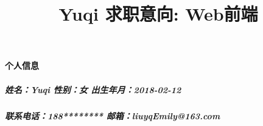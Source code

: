 \documentclass[UTF8]{ctexart}
\title{\textbf{\Large Yuqi \small 求职意向: Web前端}}
\date{} %
\begin{document}
\maketitle
\thispagestyle{fancy} %
\paragraph{个人信息}
\subparagraph{\textmd{姓名：Yuqi \hfill 性别：女 \hfill 出生年月：2018-02-12}} %
\subparagraph{\textmd{联系电话：188******** \hfill 邮箱：liuyqEmily@163.com}}
\end{document}
